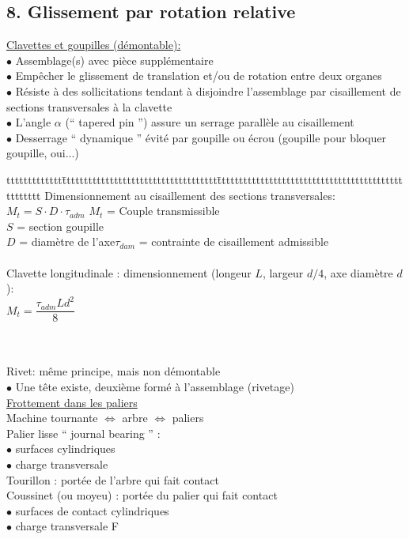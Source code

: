 \subsection*{8. Glissement par rotation relative}
\underline{Clavettes et goupilles ({\color{orange}démontable}):}\\
$\bullet$ Assemblage(s) avec pièce supplémentaire\\
$\bullet$ Empêcher le glissement de translation et/ou de rotation entre deux organes\\
$\bullet$ Résiste à des sollicitations tendant à disjoindre l’assemblage par {\color{orange}cisaillement de sections} transversales à la clavette\\
$\bullet$ L’angle $\alpha$ (“ tapered pin ”) assure un {\color{orange}serrage} parallèle au cisaillement\\
$\bullet$ Desserrage “ dynamique ” évité par goupille ou écrou (goupille pour bloquer goupille, oui...)\\

\begin{bluebox}
\begin{tabbing}
ttttttttttttt\=tttttttttttttttttttttttttttttttttttt\=ttttttttttttttttttttttttttttttttttttttttttttttttttt\kill
Dimensionnement au cisaillement des sections transversales:\\
\>$M_t=S\cdot D\cdot\tau_{adm}$\> $M_t$ = Couple transmissible\\
\>\>$S$ = section goupille\\
\>$D$ = diamètre de l'axe\>$\tau_{dam}$ = contrainte de cisaillement admissible\\\\
Clavette longitudinale : dimensionnement (longeur $L$, largeur $d/4$, axe diamètre $d$):\\
\>$M_t = \dfrac{\tau_{adm}Ld^2}{8}$
\end{tabbing}
\end{bluebox}\\\\

Rivet: même principe, mais {\color{orange}non démontable}\\
$\bullet$ Une tête existe, deuxième formé à l'assemblage (rivetage)\\

\underline{Frottement dans les paliers}\\
Machine tournante $\Leftrightarrow$ arbre $\Leftrightarrow$ {\color{orange}paliers}\\
{\color{orange}Palier lisse} “ journal bearing ” :\\
$\bullet$ surfaces cylindriques\\
$\bullet$ charge transversale\\
{\color{orange}Tourillon} : portée de l’arbre qui fait contact\\
{\color{orange}Coussinet} (ou moyeu) : portée du palier qui fait contact\\
$\bullet$ surfaces de contact cylindriques\\
$\bullet$ charge transversale F\\

